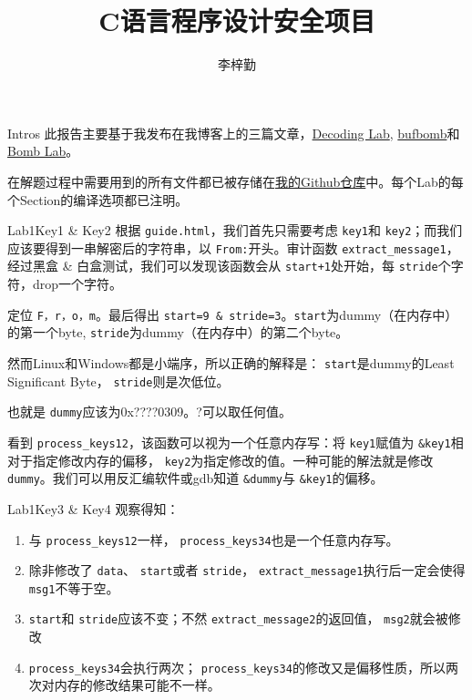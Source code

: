 \documentclass{beamer}
\title{C语言程序设计安全项目}
\author{李梓勤}
\institute{四川大学网络空间安全学院}
\begin{document}
\begin{frame}
    \titlepage
\end{frame}
\begin{frame}{Intros}
    此报告主要基于我发布在我博客上的三篇文章，\href{https://tiger1218.com/2022/12/19/scuccs-c-security-lab1/}{Decoding Lab}, \href{https://tiger1218.com/2022/12/20/scuccs-c-security-lab2/}{bufbomb}和\href{https://tiger1218.com/2022/12/21/scuccs-c-security-lab3/}{Bomb Lab}。
    
    在解题过程中需要用到的所有文件都已被存储在\href{}{我的Github仓库}中。每个Lab的每个Section的编译选项都已注明。
\end{frame}
\begin{frame}{Lab1}{Key1 \& Key2}
    根据 \texttt{guide.html}，我们首先只需要考虑 \texttt{key1}和 \texttt{key2}；而我们应该要得到一串解密后的字符串，以 \texttt{From:}开头。审计函数 \texttt{extract\_message1}，经过黑盒 \& 白盒测试，我们可以发现该函数会从 \texttt{start+1}处开始，每 \texttt{stride}个字符，drop一个字符。
    
    定位 \texttt{F，r，o，m}。最后得出 \texttt{start=9 \& stride=3}。\texttt{start}为dummy（在内存中）的第一个byte,  \texttt{stride}为dummy（在内存中）的第二个byte。

    然而Linux和Windows都是小端序，所以正确的解释是： \texttt{start}是dummy的Least Significant Byte， \texttt{stride}则是次低位。

    也就是 \texttt{dummy}应该为0x????0309。?可以取任何值。

    看到 \texttt{process\_keys12}，该函数可以视为一个任意内存写：将 \texttt{key1}赋值为 \texttt{\&key1}相对于指定修改内存的偏移， \texttt{key2}为指定修改的值。一种可能的解法就是修改 \texttt{dummy}。我们可以用反汇编软件或gdb知道 \texttt{\&dummy}与 \texttt{\&key1}的偏移。
\end{frame}
\begin{frame}{Lab1}{Key3 \& Key4}
    观察得知：

    \begin{enumerate}
        \item 与 \texttt{process\_keys12}一样， \texttt{process\_keys34}也是一个任意内存写。
        \item 除非修改了 \texttt{data}、 \texttt{start}或者 \texttt{stride}， \texttt{extract\_message1}执行后一定会使得 \texttt{msg1}不等于空。
        \item  \texttt{start}和 \texttt{stride}应该不变；不然 \texttt{extract\_message2}的返回值， \texttt{msg2}就会被修改
        \item  \texttt{process\_keys34}会执行两次； \texttt{process\_keys34}的修改又是偏移性质，所以两次对内存的修改结果可能不一样。
    \end{enumerate}
\end{frame}
\end{document}

